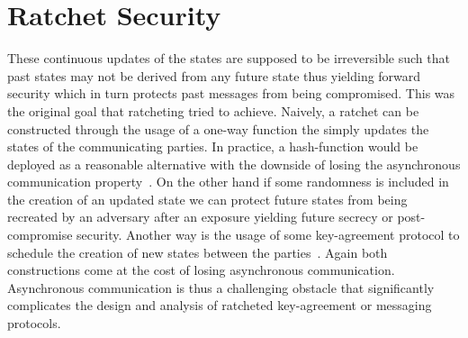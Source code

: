 \documentclass[11pt,a4paper,twoside,openright,bibliography=totoc]{scrbook}
\begin{document}
\section{Ratchet Security}
\label{sec:ratchet-security}

These continuous updates of the states are supposed to be irreversible
such that past states may not be derived from any future state thus
yielding forward security which in turn protects past messages from being
compromised. This was the original goal that ratcheting tried to
achieve. Naively, a ratchet can be constructed through the usage of a
one-way function the simply updates the states of the communicating
parties. In practice, a hash-function would be deployed as a
reasonable alternative with the downside of losing the asynchronous
communication property~\cite{bellare2003forward}. On the other hand if
some randomness is included in the creation of an updated state we can
protect future states from being recreated by an adversary after an
exposure yielding future secrecy or post-compromise security. Another
way is the usage of some key-agreement protocol to schedule the
creation of new states between the parties~\cite{cohn2016post}. Again
both constructions come at the cost of losing asynchronous
communication. Asynchronous communication is thus a challenging
obstacle that significantly complicates the design and analysis
of ratcheted key-agreement or messaging protocols.

\bigskip
\end{document}
